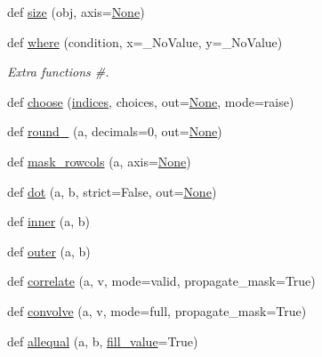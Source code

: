 \begin{DoxyCompactItemize}
\item 
def \hyperlink{namespacenumpy_1_1ma_1_1core_a899665726a2025e35f4adfaba5916272}{size} (obj, axis=\hyperlink{namespacenumpy_1_1ma_1_1core_a647ee1848dfa3692fe35a663a2aa40b3}{None})
\item 
def \hyperlink{namespacenumpy_1_1ma_1_1core_ab04bf9c9c7ae045e3b334cb1962486e6}{where} (condition, x=\+\_\+\+No\+Value, y=\+\_\+\+No\+Value)
\begin{DoxyCompactList}\small\item\em Extra functions \#. \end{DoxyCompactList}\item 
def \hyperlink{namespacenumpy_1_1ma_1_1core_ac77f54658f39f9a0deae59feb9f8c50b}{choose} (\hyperlink{namespacenumpy_1_1ma_1_1core_a1cba93d768a61f51e74e5c5f7e8233f7}{indices}, choices, out=\hyperlink{namespacenumpy_1_1ma_1_1core_a647ee1848dfa3692fe35a663a2aa40b3}{None}, mode=\textquotesingle{}raise\textquotesingle{})
\item 
def \hyperlink{namespacenumpy_1_1ma_1_1core_adee5639766b0b44d4844c6f171345eb6}{round\+\_\+} (a, decimals=0, out=\hyperlink{namespacenumpy_1_1ma_1_1core_a647ee1848dfa3692fe35a663a2aa40b3}{None})
\item 
def \hyperlink{namespacenumpy_1_1ma_1_1core_a7c5ee17b330cd52d1a752132d6987e60}{mask\+\_\+rowcols} (a, axis=\hyperlink{namespacenumpy_1_1ma_1_1core_a647ee1848dfa3692fe35a663a2aa40b3}{None})
\item 
def \hyperlink{namespacenumpy_1_1ma_1_1core_a044f5cdcff1aa842f909b038d3045ca0}{dot} (a, b, strict=False, out=\hyperlink{namespacenumpy_1_1ma_1_1core_a647ee1848dfa3692fe35a663a2aa40b3}{None})
\item 
def \hyperlink{namespacenumpy_1_1ma_1_1core_a68e9672d8feb596be0480ed2c506a7f3}{inner} (a, b)
\item 
def \hyperlink{namespacenumpy_1_1ma_1_1core_a5e630aacd078572db1b4b39a084bff1f}{outer} (a, b)
\item 
def \hyperlink{namespacenumpy_1_1ma_1_1core_af7f36bda79d44815ecf097941ee48285}{correlate} (a, v, mode=\textquotesingle{}valid\textquotesingle{}, propagate\+\_\+mask=True)
\item 
def \hyperlink{namespacenumpy_1_1ma_1_1core_a32eb5d3545066b7db575a404886daa8f}{convolve} (a, v, mode=\textquotesingle{}full\textquotesingle{}, propagate\+\_\+mask=True)
\item 
def \hyperlink{namespacenumpy_1_1ma_1_1core_a168befc64bbacd9c37254d3bbca2bfe9}{allequal} (a, b, \hyperlink{namespacenumpy_1_1ma_1_1core_ae299ee1b3a1e5865fcdc6ca98dbe24d2}{fill\+\_\+value}=True)

\end{DoxyCompactItemize}
